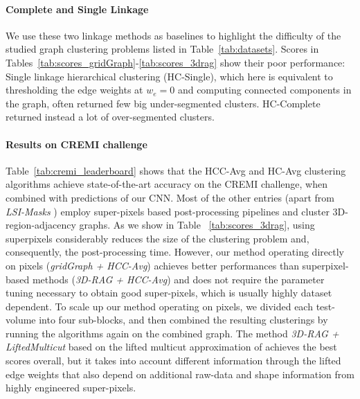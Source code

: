 \paragraph{Complete and Single Linkage} We use these two linkage methods as baselines to highlight the difficulty of the studied graph clustering problems listed in Table~\ref{tab:datasets}. Scores in Tables~\ref{tab:scores_gridGraph}-\ref{tab:scores_3drag} show their poor performance: Single linkage hierarchical clustering (HC-Single), which here is equivalent to thresholding the edge weights at $w_e=0$ and computing connected components in the graph, often returned few big under-segmented clusters. HC-Complete returned instead a lot of over-segmented clusters. 








\paragraph{Results on CREMI challenge} 
Table~\ref{tab:cremi_leaderboard} shows that the HCC-Avg and HC-Avg clustering algorithms achieve state-of-the-art accuracy on the CREMI challenge, when combined with predictions of our CNN.
Most of the other entries (apart from \emph{LSI-Masks} \cite{bailoni2020proposal}) employ super-pixels based post-processing pipelines and cluster 3D-region-adjacency graphs. As we show in Table ~\ref{tab:scores_3drag}, using superpixels considerably reduces the size of the clustering problem and, consequently, the post-processing time. 
However, our method operating directly on pixels (\emph{gridGraph + HCC-Avg}) achieves better performances than superpixel-based methods (\emph{3D-RAG + HCC-Avg}) and does not require the parameter tuning necessary to obtain good super-pixels, which is usually highly dataset dependent.
To scale up our method operating on pixels, we divided each test-volume into four sub-blocks, and then combined the resulting clusterings by running the algorithms again on the combined graph.
The method \emph{3D-RAG + LiftedMulticut} based on the lifted multicut approximation of \cite{beier2017multicut} achieves the best scores overall, but it takes into account different information through the lifted edge weights that also depend on additional raw-data and shape information from highly engineered super-pixels. 

